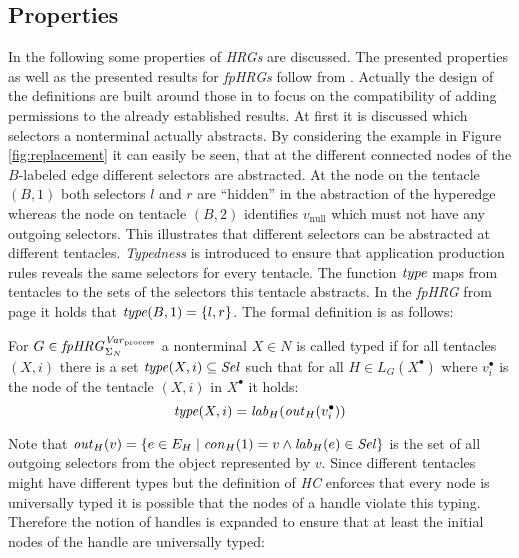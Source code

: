 	\subsection{Properties}
	In the following some properties of \emph{\acp{HRG}} are discussed. The
	presented properties as well as the presented results for \emph{\acp{fpHRG}}
	follow from \cite{LocalGreibachNormalForm}. Actually the design of the
	definitions are built around those in \cite{LocalGreibachNormalForm} to
	focus on the compatibility of adding permissions to the already established
	results. At first it is discussed which selectors a nonterminal actually
	abstracts. By considering the example in Figure \ref{fig:replacement} it can
	easily be seen, that at the different connected nodes of the $B$-labeled
	edge different selectors are abstracted. At the node on the tentacle $(B,1)$
	both selectors $l$ and $r$ are \enquote{hidden} in the abstraction of the
	hyperedge whereas the node on tentacle $(B,2)$ identifies $v_{\text{null}}$
	which must not have any outgoing selectors. This illustrates that different
	selectors can be abstracted at different tentacles. \emph{Typedness} is
	introduced to ensure that application production rules reveals the same
	selectors for every tentacle. The function $\mathit{type}$ maps from tentacles to
	the sets of the selectors this tentacle abstracts. In the \emph{\ac{fpHRG}}
	from page \pageref{eq:G} it holds that $\mathit{type}(B,1) = \{l,r\}$. The formal
	definition is as follows:
	\begin{definition}[Typedness]
		For $G\in\mathit{fpHRG}_{\Sigma_{N}}^{\mathit{Var}_{\text{process}}}$ a nonterminal $X\in N$ is called typed if for all
		tentacles $(X,i)$ there is a set $\mathit{type}(X,i)\subseteq\mathit{Sel}$ such that for
		all $H\in L_{G}(X^{\bullet})$ where $v^{\bullet}_{i}$ is the node of the
		tentacle $(X,i)$ in $X^{\bullet}$ it holds:
		\begin{equation*}
			\mathit{type}(X,i) = \mathit{lab}_H(\mathit{out}_{H}(v^{\bullet}_{i}))
		\end{equation*}
	\end{definition}
	Note that $\mathit{out}_{H}(v) = \{e \in E_{H}\mid \mathit{con}_{H}(1) = v
	\land \mathit{lab}_{H}(e)\in\mathit{Sel}\}$ is the set of all outgoing
	selectors from the object represented by $v$. Since different tentacles
	might have different types but the definition
	of \emph{\ac{HC}} enforces that every node is universally typed it is
	possible that the nodes of a handle violate this typing. Therefore the
	notion of handles is expanded to ensure that at least the initial nodes of
	the handle are universally typed:
